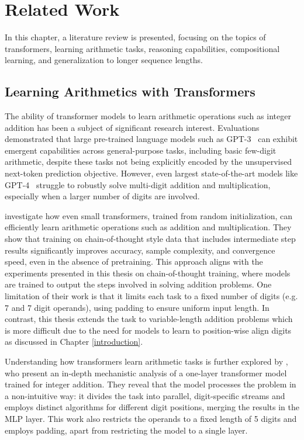 \chapter{Related Work}\label{related_work}

In this chapter, a literature review is presented, focusing on the topics of transformers, learning arithmetic tasks, reasoning capabilities, compositional learning, and generalization to longer sequence lengths.


\section{Learning Arithmetics with Transformers}\label{sec:sota_arithmetic_tasks}

The ability of transformer models \parencite{vaswani_attention_2017} to learn arithmetic operations such as integer addition has been a subject of significant research interest. Evaluations demonstrated that large pre-trained language models such as GPT-3~\parencite{brown_language_2020} can exhibit emergent capabilities across general-purpose tasks, including basic few-digit arithmetic, despite these tasks not being explicitly encoded by the unsupervised next-token prediction objective. However, even largest state-of-the-art models like GPT-4~\parencite{achiam_gpt-4_2023} struggle to robustly solve multi-digit addition and multiplication, especially when a larger number of digits are involved.

\cite{lee_teaching_2023} investigate how even small transformers, trained from random initialization, can efficiently learn arithmetic operations such as addition and multiplication. They show that training on chain-of-thought style data that includes intermediate step results significantly improves accuracy, sample complexity, and convergence speed, even in the absence of pretraining. This approach aligns with the experiments presented in this thesis on chain-of-thought training, where models are trained to output the steps involved in solving addition problems. One limitation of their work is that it limits each task to a fixed number of digits (e.g. 7 and 7 digit operands), using padding to ensure uniform input length. In contrast, this thesis extends the task to variable-length addition problems which is more difficult due to the need for models to learn to position-wise align digits as discussed in Chapter \ref{introduction}.

Understanding how transformers learn arithmetic tasks is further explored by \cite{quirke_understanding_2023}, who present an in-depth mechanistic analysis of a one-layer transformer model trained for integer addition. They reveal that the model processes the problem in a non-intuitive way: it divides the task into parallel, digit-specific streams and employs distinct algorithms for different digit positions, merging the results in the MLP layer. This work also restricts the operands to a fixed length of 5 digits and employs padding, apart from restricting the model to a single layer.

